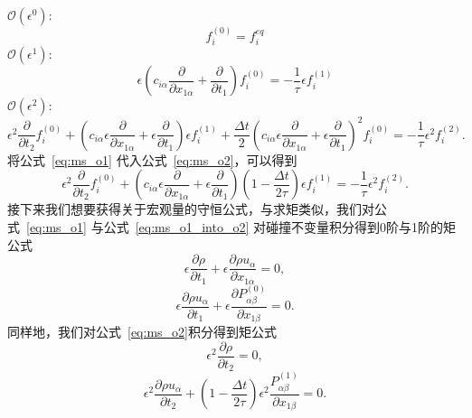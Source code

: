 \noindent
$\mathcal{O}\left(\epsilon^{0}\right):$
\begin{equation}
f_{i}^{(0)}=f_{i}^{e q}
\end{equation}
$\mathcal{O}\left(\epsilon^{1}\right):$
\begin{equation}
\epsilon\left({c}_{i \alpha} \frac{\partial}{\partial x_{1 \alpha}}+\frac{\partial}{\partial t_{1}}\right) f_{i}^{(0)}=-\frac{1}{\tau} \epsilon f_{i}^{(1)}
\label{eq:ms_o1}
\end{equation}
$\mathcal{O}\left(\epsilon^{2}\right):$
\begin{equation}
\epsilon^{2} \frac{\partial}{\partial t_{2}} f_{i}^{(0)}+\left({c}_{i \alpha} \epsilon \frac{\partial}{\partial x_{1 \alpha}}+\epsilon \frac{\partial}{\partial t_{1}}\right) \epsilon f_{i}^{(1)}+\frac{\Delta t}{2}\left({c}_{i \alpha} \epsilon \frac{\partial}{\partial x_{1 \alpha}}+\epsilon \frac{\partial}{\partial t_{1}}\right)^{2} f_{i}^{(0)}=-\frac{1}{\tau} \epsilon^{2} f_{i}^{(2)} .
\label{eq:ms_o2}
\end{equation}
将公式~\ref{eq:ms_o1} 代入公式~\ref{eq:ms_o2}，可以得到
\begin{equation}
\epsilon^{2} \frac{\partial}{\partial t_{2}} f_{i}^{(0)}+\left({c}_{i \alpha} \epsilon \frac{\partial}{\partial x_{1 \alpha}}+\epsilon \frac{\partial}{\partial t_{1}}\right)\left(1-\frac{\Delta t}{2 \tau}\right) \epsilon f_{i}^{(1)}=-\frac{1}{\tau} \epsilon^{2} f_{i}^{(2)} .
\label{eq:ms_o1_into_o2}
\end{equation}
接下来我们想要获得关于宏观量的守恒公式，与求矩类似，我们对公式~\ref{eq:ms_o1} 与公式~\ref{eq:ms_o1_into_o2} 对碰撞不变量积分得到0阶与1阶的矩公式
\begin{equation}
\epsilon \frac{\partial \rho}{\partial t_{1}}+\epsilon \frac{\partial \rho u_{\alpha}}{\partial x_{1 \alpha}}=0 ,
\label{eq:ms_moment_o1_a}
\end{equation}
\begin{equation}
\epsilon \frac{\partial \rho u_{\alpha}}{\partial t_{1}}+\epsilon \frac{\partial P_{\alpha \beta}^{(0)}}{\partial x_{1 \beta}}=0 .
\label{eq:ms_moment_o1_b}
\end{equation}
同样地，我们对公式~\ref{eq:ms_o2}积分得到矩公式
\begin{equation}
\epsilon^{2} \frac{\partial \rho}{\partial t_{2}} = 0 ,
\label{eq:ms_moment_o2_a}
\end{equation}
\begin{equation}
\epsilon^{2} \frac{\partial \rho u_{\alpha}}{\partial t_{2}} +\left(1-\frac{\Delta t}{2 \tau}\right) \epsilon^{2} \frac{P_{\alpha \beta}^{(1)}}{\partial x_{1 \beta}}=0 .
\label{eq:ms_moment_o2_b}
\end{equation}
